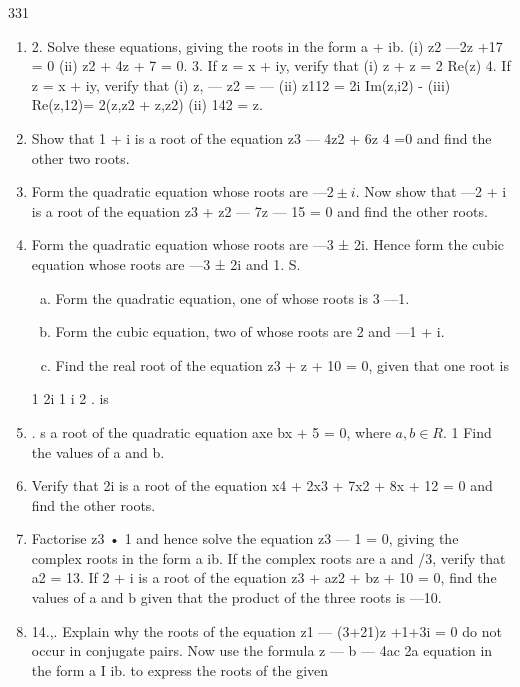 \documentclass[12pt, a4paper]{report}
\theoremstyle{plain}
\theoremstyle{definition}
\theoremstyle{remark}
\begin{document}
331 
\begin{enumerate}
\item 

2. Solve these equations, giving the roots in the form a + ib. (i) z2 —2z +17 = 0 (ii) z2 + 4z + 7 = 0. 3. If z = x + iy, verify that (i) z + z = 2 Re(z) 4. If z = x + iy, verify that (i) z, — z2 = — (ii) z112 = 2i Im(z,i2) - (iii) Re(z,12)= 2(z,z2 + z,z2) 
(ii) 142 = z. 
\item Show that 1 + i is a root of the equation z3 — 4z2 + 6z 4 =0 and find the other two roots. 
\item Form the quadratic equation whose roots are $—2 \pm i$. Now show that —2 + i is a root of the equation z3 + z2 — 7z — 15 = 0 and find the other roots. 
\item Form the quadratic equation whose roots are —3 ± 2i. Hence form the cubic equation whose roots are —3 ± 2i and 1. S. 
\begin{enumerate}[(a)]
\item Form the quadratic equation, one of whose roots is 3 —1.
\item Form the cubic equation, two of whose roots are 2 and —1 + i.  
\item Find the real root of the equation z3 + z + 10 = 0, given that one root is 
\end{enumerate}
1 2i 
1 i 2 . is 
\item . s a root of the quadratic equation axe bx + 5 = 0, where $a,b \in R$. 1 Find the values of a and b. 
\item Verify that 2i is a root of the equation x4 + 2x3 + 7x2 + 8x + 12 = 0 and find the other roots.
\item Factorise z3 • 1 and hence solve the equation z3 — 1 = 0, giving the complex roots in the form a ib. 
If the complex roots are a and /3, verify that a2 = 13. If 2 + i is a root of the equation z3 + az2 + bz + 10 = 0, find the values of a and b given that the product of the three roots is —10. 
\item 14.,. Explain why the roots of the equation z1 — (3+21)z +1+3i = 0 do not occur in conjugate pairs. 
Now use the formula z —  b — 4ac 2a equation in the form a I ib. 
to express the roots of the given 

\end{enumerate}
\end{document}
